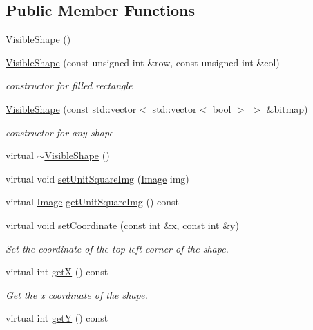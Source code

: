 \subsection*{Public Member Functions}
\begin{DoxyCompactItemize}
\item 
\mbox{\hyperlink{class_visible_shape_a280deeca2a39d227887ff2e13b009c0a}{Visible\+Shape}} ()
\item 
\mbox{\hyperlink{class_visible_shape_adc9d11f72af8b96fdb379330fd9de592}{Visible\+Shape}} (const unsigned int \&row, const unsigned int \&col)
\begin{DoxyCompactList}\small\item\em constructor for filled rectangle \end{DoxyCompactList}\item 
\mbox{\hyperlink{class_visible_shape_a0efa89e218acbaeaf4f2453467d54cc9}{Visible\+Shape}} (const std\+::vector$<$ std\+::vector$<$ bool $>$ $>$ \&bitmap)
\begin{DoxyCompactList}\small\item\em constructor for any shape \end{DoxyCompactList}\item 
virtual \mbox{\hyperlink{class_visible_shape_a3cf57d96e1b85f8cda8bedefcc23ec45}{$\sim$\+Visible\+Shape}} ()
\item 
virtual void \mbox{\hyperlink{class_visible_shape_ae0b09cac51ba9af744cddce67fe0180a}{set\+Unit\+Square\+Img}} (\mbox{\hyperlink{class_image}{Image}} img)
\item 
virtual \mbox{\hyperlink{class_image}{Image}} \mbox{\hyperlink{class_visible_shape_ab62a8320e8084bfdcc43b5c3cf072cd3}{get\+Unit\+Square\+Img}} () const
\item 
virtual void \mbox{\hyperlink{class_visible_shape_a350f7faac22e405df7c4012fe9d03fac}{set\+Coordinate}} (const int \&x, const int \&y)
\begin{DoxyCompactList}\small\item\em Set the coordinate of the top-\/left corner of the shape. \end{DoxyCompactList}\item 
virtual int \mbox{\hyperlink{class_visible_shape_a623ee2bd2e408da908ec5b210347b36e}{getX}} () const
\begin{DoxyCompactList}\small\item\em Get the x coordinate of the shape. \end{DoxyCompactList}\item 
virtual int \mbox{\hyperlink{class_visible_shape_ace747d31bf685044d815b6fa1944055e}{getY}} () const

\end{DoxyCompactItemize}
